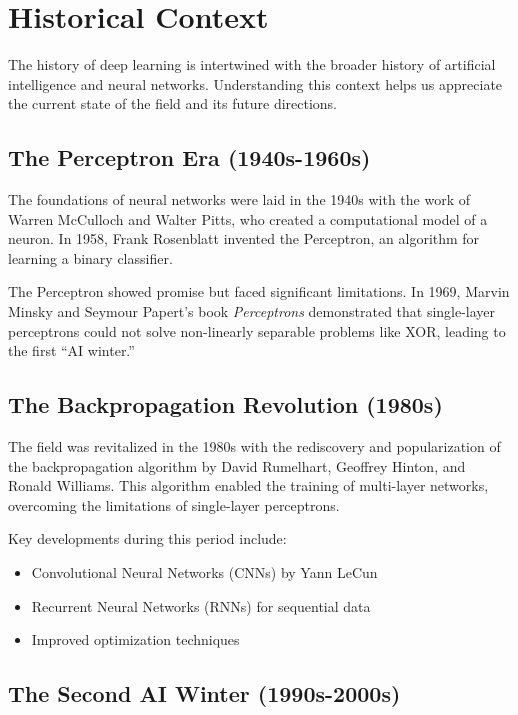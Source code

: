 
\section{Historical Context }
\label{sec:historical-context}

The history of deep learning is intertwined with the broader history of artificial intelligence and neural networks. Understanding this context helps us appreciate the current state of the field and its future directions.

\subsection{The Perceptron Era (1940s-1960s)}

The foundations of neural networks were laid in the 1940s with the work of Warren McCulloch and Walter Pitts, who created a computational model of a neuron. In 1958, Frank Rosenblatt invented the Perceptron, an algorithm for learning a binary classifier.

The Perceptron showed promise but faced significant limitations. In 1969, Marvin Minsky and Seymour Papert's book \emph{Perceptrons} demonstrated that single-layer perceptrons could not solve non-linearly separable problems like XOR, leading to the first ``AI winter.''

\subsection{The Backpropagation Revolution (1980s)}

The field was revitalized in the 1980s with the rediscovery and popularization of the backpropagation algorithm by David Rumelhart, Geoffrey Hinton, and Ronald Williams. This algorithm enabled the training of multi-layer networks, overcoming the limitations of single-layer perceptrons.

Key developments during this period include:
\begin{itemize}
    \item Convolutional Neural Networks (CNNs) by Yann LeCun
    \item Recurrent Neural Networks (RNNs) for sequential data
    \item Improved optimization techniques
\end{itemize}

\subsection{The Second AI Winter (1990s-2000s)}

